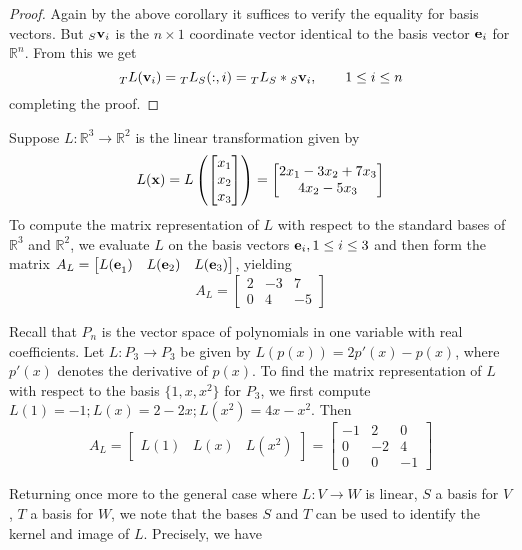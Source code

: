 \documentclass{ximera}
\begin{document}
\begin{proof} Again by the above corollary it suffices to verify the equality for basis vectors. But ${}_S{\bf v}_i$ is the $n\times 1$ coordinate vector identical to the basis vector ${\bf e}_i$ for $\mathbb R^n$. From this we get
\[
{}_TL({\bf v}_i) = {}_TL_S(:,i) = {}_TL_S*{}_S{\bf v}_i,\qquad 1\le i\le n
\]
completing the proof.
\end{proof}

\begin{example} Suppose $L:\mathbb R^3\to \mathbb R^2$ is the linear transformation given by
\[
L({\bf x}) = L\left(\begin{bmatrix} x_1\\x_2\\x_3\end{bmatrix}\right) = \begin{bmatrix} 2x_1 - 3x_2 + 7x_3\\ 4x_2 - 5x_3\end{bmatrix}
\]
To compute the matrix representation of $L$ with respect to the standard bases of $\mathbb R^3$ and $\mathbb R^2$, we evaluate $L$ on the basis vectors ${\bf e}_i, 1\le i\le 3$ and then form the matrix $A_L = \begin{bmatrix} {L(\bf e}_1) & L({\bf e}_2) & L({\bf e}_3)\end{bmatrix}$, yielding
\[
A_L = \begin{bmatrix} 2 & -3 & 7\\ 0 & 4 & -5 \end{bmatrix}
\]
\end{example}

\begin{example} Recall that $P_n$ is the vector space of polynomials in one variable with real coefficients. Let $L:P_3\to P_3$ be given by $L(p(x)) = 2p'(x) - p(x)$, where $p'(x)$ denotes the derivative of $p(x)$. To find the matrix representation of $L$ with respect to the basis $\{1,x,x^2\}$ for $P_3$, we first compute $L(1) = -1; L(x) = 2 - 2x; L(x^2) = 4x - x^2$. Then
\[
A_L = \begin{bmatrix} L(1) & L(x) & L(x^2)\end{bmatrix} = \begin{bmatrix} -1 & 2 & 0\\0 & -2 & 4\\0 & 0 & -1\end{bmatrix}
\]
\end{example}

Returning once more to the general case where $L:V\to W$ is linear, $S$ a basis for $V$, $T$ a basis for $W$, we note that the bases $S$ and $T$ can be used to identify the kernel and image of $L$. Precisely, we have
\end{document}
